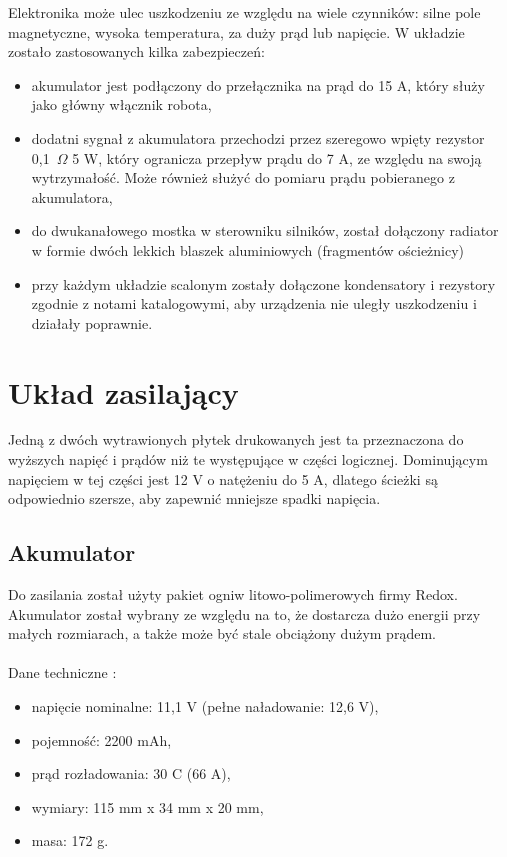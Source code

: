 \documentclass[a4paper,12pt,twoside,openany]{report}
\begin{document}
Elektronika może ulec uszkodzeniu ze względu na wiele czynników: silne pole magnetyczne, wysoka temperatura, za duży prąd lub napięcie. W układzie zostało zastosowanych kilka zabezpieczeń:
\begin{itemize}
\item akumulator jest podłączony do przełącznika na prąd do 15 A, który służy jako główny włącznik robota,
\item dodatni sygnał z akumulatora przechodzi przez szeregowo wpięty rezystor 0,1~$\Omega$ 5 W, który ogranicza przepływ prądu do 7 A, ze względu na swoją wytrzymałość. Może również służyć do pomiaru prądu pobieranego z akumulatora,
\item do dwukanałowego mostka w sterowniku silników, został dołączony radiator w formie dwóch lekkich blaszek aluminiowych (fragmentów ościeżnicy)
\item przy każdym układzie scalonym zostały dołączone kondensatory i rezystory zgodnie z notami katalogowymi, aby urządzenia nie uległy uszkodzeniu i działały poprawnie.
\end{itemize}

\section{Układ zasilający}

Jedną z dwóch wytrawionych płytek drukowanych jest ta przeznaczona do wyższych napięć i prądów niż te występujące w części logicznej. Dominującym napięciem w tej części jest 12 V o natężeniu do 5 A, dlatego ścieżki są odpowiednio szersze, aby zapewnić mniejsze spadki napięcia.

\subsection{Akumulator}

Do zasilania został użyty pakiet ogniw litowo-polimerowych firmy Redox. Akumulator został wybrany ze względu na to, że dostarcza dużo energii przy małych rozmiarach, a także może być stale obciążony dużym prądem. \\
\\
\noindent Dane techniczne \cite{aku}:
\begin{itemize}
\item napięcie nominalne: 11,1 V (pełne naładowanie: 12,6 V),
\item pojemność: 2200 mAh,
\item prąd rozładowania: 30 C (66 A),
\item wymiary: 115 mm x 34 mm x 20 mm,
\item masa: 172 g.
\end{itemize}
\end{document}
